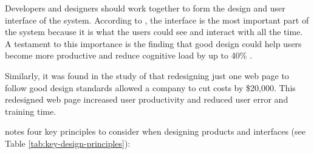         Developers and designers should work together to form the design and user interface of the system. According to \citet{galitz2007essential}, the interface is the most important part of the system because it is what the users could see and interact with all the time. A testament to this importance is the finding that good design could help users become more productive and reduce cognitive load by up to 40\% \citep{galitz2007essential}. 
        
        Similarly, it was found in the study of \citep{cope1995cost} that redesigning just one web page to follow good design standards allowed a company to cut costs by \$20,000. This redesigned web page increased user productivity and reduced user error and training time. 
        
        \citet{mandelbaum2014design} notes four key principles to consider when designing products and interfaces (see Table \ref{tab:key-design-principles}):
        
